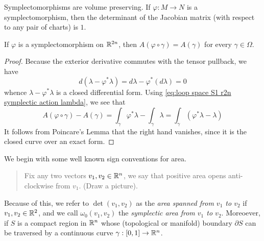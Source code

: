 \documentclass[../main-v2-manifolds.tex]{subfiles}
\begin{document}
%
%
%
\begin{remark}
    Symplectomorphisms are volume preserving. If $\varphi:M\to N$ is a symplectomorphism, then the determinant of the Jacobian matrix (with respect to any pair of charts) is $1$.
\end{remark}
%
\begin{lemma}
    If $\varphi$ is a symplectomorphism on ${\mathbb{R}^{2n}}$, then $A(\varphi\circ\gamma) = A(\gamma)$ for every $\gamma\in \Omega$.
\end{lemma}
\begin{proof}
    Because the exterior derivative commutes with the tensor pullback, we have
    \[
        d(\lambda - \varphi^*\lambda) = d\lambda - \varphi^*(d\lambda)= 0
    \]
    whence $\lambda - \varphi^*\lambda$ is a closed differential form. Using \cref{eq:loop space S1 r2n symplectic action lambda}, we see that
    \[
        A(\varphi\circ\gamma) - A(\gamma) = \int_{\gamma}\varphi^*\lambda - \int_{\gamma}\lambda = \int_{\gamma}(\varphi^*\lambda - \lambda)
    \]
    It follows from Poincare's Lemma that the right hand vanishes, since it is the closed curve over an exact form.
\end{proof}
We begin with some well known sign conventions for area.
\begin{quote}
    Fix any two vectors $v_1, v_2\in {\mathbb{R}^n}$, we say that positive area opens anti-clockwise from $v_1$. (Draw a picture).
\end{quote}
Because of this, we refer to $\det(v_1, v_2)$ as the \emph{area spanned from $v_1$ to $v_2$} if $v_1,v_2\in\mathbb{R}^2$, and we call $\omega_0(v_1,v_2)$ the \emph{symplectic area from $v_1$ to $v_2$}. Moreoever, if $S$ is a compact region in ${\mathbb{R}^n}$ whose (topological or manifold) boundary $\partial S$ can be traversed by a continuous curve $\gamma:[0,1]\to{\mathbb{R}^n}$. 
\end{document}
